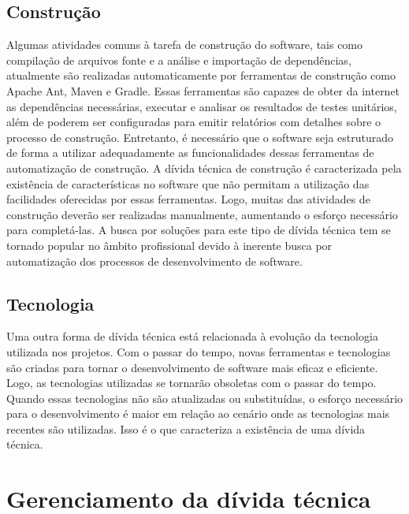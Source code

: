 \subsection{Construção}
Algumas atividades comuns à tarefa de construção do software, tais como compilação de arquivos fonte e a análise e importação de dependências, atualmente são realizadas automaticamente por ferramentas de construção como Apache Ant\cite{de2015learning}, Maven\cite{goldman2007maven} e Gradle\cite{muschko2014gradle}. Essas ferramentas são capazes de obter da internet as dependências necessárias, executar e analisar os resultados de testes unitários, além de poderem ser configuradas para emitir relatórios com detalhes sobre o processo de construção.  Entretanto, é necessário que o software seja estruturado de forma a utilizar adequadamente as funcionalidades dessas ferramentas de automatização de construção. A dívida técnica de construção é caracterizada pela existência de características no software que não permitam a utilização das facilidades oferecidas por essas ferramentas. Logo, muitas das atividades de construção deverão ser realizadas manualmente, aumentando o esforço necessário para completá-las.  A busca por soluções para este tipo de dívida técnica tem se tornado popular no âmbito profissional devido à inerente busca por automatização dos processos de desenvolvimento de software\cite{morgenthaler2012searching}.

\subsection{Tecnologia}
\label{tipo_td_tecnologia}

Uma outra forma de dívida técnica está relacionada à evolução da tecnologia utilizada nos projetos.  Com o passar do tempo, novas ferramentas e tecnologias são criadas para tornar o desenvolvimento de software mais eficaz e eficiente. Logo, as tecnologias utilizadas se tornarão obsoletas com o passar do tempo. Quando essas tecnologias não são atualizadas ou substituídas, o esforço necessário para o desenvolvimento é maior em relação ao cenário onde as tecnologias mais recentes são utilizadas. Isso é o que caracteriza a existência de uma dívida técnica.







\section{Gerenciamento da dívida técnica}

